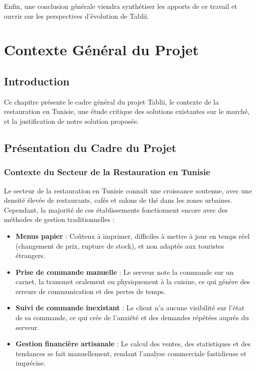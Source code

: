 \documentclass[12pt,a4paper]{report}
\begin{document}
Enfin, une conclusion générale viendra synthétiser les apports de ce travail et ouvrir sur les perspectives d'évolution de Tablii.

\cleardoublepage
\chapter{Contexte Général du Projet}

\section{Introduction}

Ce chapitre présente le cadre général du projet Tablii, le contexte de la restauration en Tunisie, une étude critique des solutions existantes sur le marché, et la justification de notre solution proposée.

\section{Présentation du Cadre du Projet}

\subsection{Contexte du Secteur de la Restauration en Tunisie}

Le secteur de la restauration en Tunisie connaît une croissance soutenue, avec une densité élevée de restaurants, cafés et salons de thé dans les zones urbaines. Cependant, la majorité de ces établissements fonctionnent encore avec des méthodes de gestion traditionnelles :

\begin{itemize}[leftmargin=1.5cm, itemsep=0.3cm]
    \item \textbf{Menus papier} : Coûteux à imprimer, difficiles à mettre à jour en temps réel (changement de prix, rupture de stock), et non adaptés aux touristes étrangers.
    \item \textbf{Prise de commande manuelle} : Le serveur note la commande sur un carnet, la transmet oralement ou physiquement à la cuisine, ce qui génère des erreurs de communication et des pertes de temps.
    \item \textbf{Suivi de commande inexistant} : Le client n'a aucune visibilité sur l'état de sa commande, ce qui crée de l'anxiété et des demandes répétées auprès du serveur.
    \item \textbf{Gestion financière artisanale} : Le calcul des ventes, des statistiques et des tendances se fait manuellement, rendant l'analyse commerciale fastidieuse et imprécise.
\end{itemize}
\end{document}

